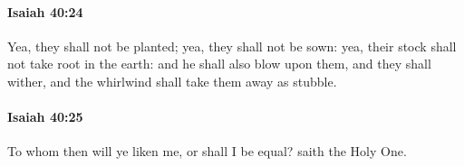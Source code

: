 		\paragraph{Isaiah 40:24} %
			\label{ISAIAH-40-24}

			Yea, they shall not be planted; yea, they shall not be sown: yea, their stock shall not take root in the earth: and he shall also blow upon them, and they shall wither, and the whirlwind shall take them away as stubble.


		\paragraph{Isaiah 40:25} %
			\label{ISAIAH-40-25}

			To whom then will ye liken me, or shall I be equal? saith the Holy One.



